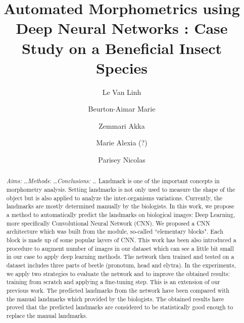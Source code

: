 \documentclass[review]{elsarticle}
\begin{document}
\begin{frontmatter}

  \title{Automated Morphometrics using Deep Neural Networks : Case Study on a Beneficial Insect Species}




\author[labri,itdlu]{Le Van Linh}
\author[labri]{Beurton-Aimar Marie}
\author[labri]{Zemmari Akka}
\author[igepp]{Marie Alexia (?)}
\author[igepp]{Parisey Nicolas}


\address[igepp]{UMR 1349 IGEPP, BP 35327, 35653 Le Rheu, France}

\address[labri]{University of Bordeaux, 351, cours de la Libération, 33405 Talence}
\address[itdlu]{Dalat University, Dalat, Lamdong, Vietnam}


\begin{abstract}
\textit{Aims:} \ldots \textit{Methods:} \ldots \textit{Conclusions:} \ldots
Landmark is one of the important concepts in morphometry analysis. Setting landmarks is not only used to measure the shape of the object but is also applied to analyze the inter-organisms variations. Currently, the landmarks are mostly determined manually by the biologists.
In this work, we propose a method to automatically predict the landmarks on biological images: Deep Learning, more specifically Convolutional Neural Network (CNN). We proposed a CNN architecture which was built from the module, so-called ``elementary blocks". Each block is made up of some popular layers of CNN. This work has been also introduced a procedure to augment number of images in our dataset which can see a little bit small in our case to apply deep learning methods. 
The network then trained and tested on a dataset includes three parts of beetle (pronotum, head and elytra). In the experiments, we apply two strategies to evaluate the network and to improve the obtained results: training from scratch and applying a fine-tuning step. This is an extension of our previous work. The predicted landmarks from the network have been compared with the manual landmarks which provided by the biologists. The obtained results have proved that the predicted landmarks are considered to be statistically good enough to replace the manual landmarks.
\end{abstract}


\end{frontmatter}
\end{document}
